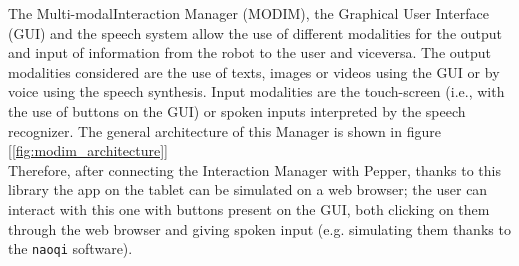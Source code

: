 \documentclass[12pt, letterpaper, twoside]{article}
\begin{document}
The Multi-modalInteraction Manager (MODIM), the Graphical User Interface (GUI) and the speech system allow the use of different modalities for the output and input of information from the robot to the user and viceversa. The output modalities considered are the use of texts, images or videos using the GUI or by voice using the speech synthesis. Input modalities are the touch-screen (i.e., with the use of buttons on the GUI) or spoken inputs interpreted by the speech recognizer. The general architecture of this Manager is shown in figure [\ref{fig:modim_architecture}]\\

Therefore, after connecting the Interaction Manager with Pepper, thanks to this library the app on the tablet can be simulated on a web browser; the user can interact with this one with buttons present on the GUI, both clicking on them through the web browser and giving spoken input (e.g. simulating them thanks to the \verb|naoqi| software).
\end{document}
